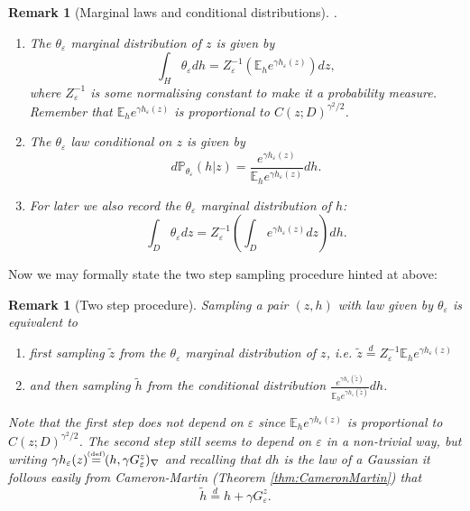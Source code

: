 \documentclass[11pt,reqno]{amsart}
\numberwithin{equation}{section}
\newtheorem{rem}[thm]{Remark}
\newcommand{\eqby}[1]{\mathrel{\stackrel{#1}{=}}}
\newcommand{\eqbydef}{\mathrel{\stackrel{\hspace*{-3mm}\text{\tiny(def)}\hspace*{-3mm}}{=}}}
\newcommand{\eps}{\varepsilon}
\begin{document}
\begin{rem}[Marginal laws and conditional distributions]\label{rem:marginalLawsandCondDistr}.\\
	\begin{enumerate}
		\item The $\theta_\eps$ marginal distribution of $z$ is given by $$\int_H\theta_\eps dh = Z_\eps^{-1}\left(\mathbb E_h e^{\gamma h_\eps(z)}\right)dz,$$ where $Z_\eps^{-1}$ is some normalising constant to make it a probability measure. Remember that $\mathbb E_h e^{\gamma h_\eps(z)}$ is proportional to $C(z;D)^{\gamma^2/2}$.
		\item The $\theta_\eps$ law conditional on $z$ is given by $$d\mathbb P_{\theta_\eps}(h|z)=\frac{e^{\gamma h_\eps(z)}}{\mathbb E_h e^{\gamma h_\eps(z)}}dh.$$
		\item For later we also record the $\theta_\eps$ marginal distribution of $h$: $$\int_D\theta_\eps dz = Z_\eps^{-1}\left(\int_D e^{\gamma h_\eps(z)}dz\right)dh.$$
	\end{enumerate}
\end{rem}

Now we may formally state the two step sampling procedure hinted at above:

\begin{rem}[Two step procedure]\label{rem:twoStepProcedure}
	Sampling a pair $(z,h)$ with law given by $\theta_\eps$ is equivalent to
	\begin{enumerate}
		\item first sampling $\tilde z$ from the $\theta_\eps$ marginal distribution of $z$, i.e. $\tilde z\eqby{d} Z_\eps^{-1}\mathbb E_h e^{\gamma h_\eps(z)}$
		\item and then sampling $\tilde h$ from the conditional distribution $\frac{e^{\gamma h_\eps(\tilde z)}}{\mathbb E_h e^{\gamma h_\eps(\tilde z)}}dh$.
	\end{enumerate}
	Note that the first step does not depend on $\eps$ since $\mathbb E_h e^{\gamma h_\eps(z)}$ is proportional to $C(z;D)^{\gamma^2/2}$. The second step still seems to depend on $\eps$ in a non-trivial way, but writing $\gamma h_\eps(z)\eqbydef (h,\gamma G_\eps^z)_\nabla$ and recalling that $dh$ is the law of a Gaussian it follows easily from Cameron-Martin (Theorem \ref{thm:CameronMartin}) that \begin{equation}\label{eq:lawoftildeHisHplusGreensFct}
			\tilde h\eqby{d}h+\gamma G_\eps^z.
		\end{equation}
\end{rem}
\end{document}

